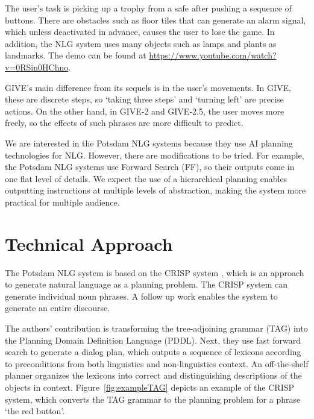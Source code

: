 \documentclass[11pt]{article} %
\begin{document}
The user's task is picking up a trophy from a safe after pushing a sequence of buttons.
There are obstacles such as floor tiles that can generate an alarm signal,
which unless deactivated in advance, causes the user to lose the game.
In addition, the NLG system uses many objects such as lamps and plants as landmarks.
The demo can be found at \url{https://www.youtube.com/watch?v=0RSin0HChno}.

GIVE's main difference from its sequels is in the user's movements.
In GIVE, these are discrete steps, so `taking three steps' and `turning left' are precise actions.
On the other hand, in GIVE-2 and GIVE-2.5, the user moves more freely,
so the effects of such phrases are more difficult to predict.

We are interested in the Potsdam NLG systems \cite{garoufi2011potsdam}
because they use AI planning technologies for NLG.
However, there are modifications to be tried.
For example, the Potsdam NLG systems use Forward Search (FF),
so their outputs come in one flat level of details.
We expect the use of a hierarchical planning enables outputting instructions
at multiple levels of abstraction, making the system more practical
for multiple audience.

\section{Technical Approach}

The Potsdam NLG system \cite{garoufi2011combining, garoufi2011potsdam, garoufi2014generation}
is based on the CRISP system \cite{crisp07},
which is an approach to generate natural language as a planning problem.
The CRISP system can generate individual noun phrases.
A follow up work \cite{scrisp-10} enables the system to generate an entire discourse.

The authors' contribution is transforming the tree-adjoining grammar (TAG)
into the Planning Domain Definition Language (PDDL).
Next, they use fast forward search \cite{hoffmann:nebel:jair-01} to generate
a dialog plan, which outputs a sequence of lexicons according to preconditions
from both linguistics and non-linguistics context.
An off-the-shelf planner organizes the lexicons into correct
and distinguishing descriptions of the objects in context.
Figure~\ref{fig:exampleTAG} depicts an example of the CRISP system,
which converts the TAG grammar to the planning problem for a phrase `the red button'.
\end{document}
